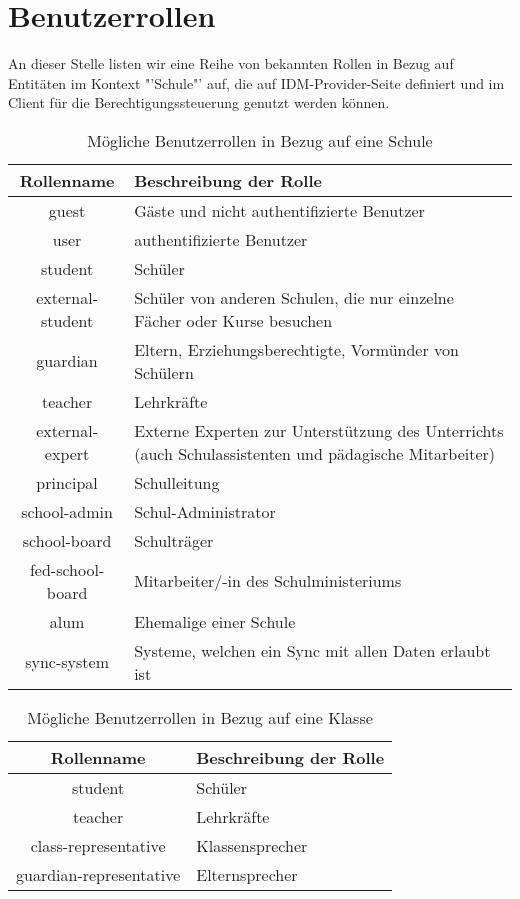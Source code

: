 \section{Benutzerrollen}
\label{Benutzerrollen}
An dieser Stelle listen wir eine Reihe von bekannten Rollen in Bezug auf Entitäten im Kontext "'Schule"' auf, die auf IDM-Provider-Seite definiert und im Client für die Berechtigungssteuerung genutzt werden können.
\\


\begin{table}[htb]
	\begin{tabularx}{\textwidth}{|c|X|}
		\hline
\textbf{Rollenname} & \textbf{Beschreibung der Rolle} \\ \hline
guest & Gäste und nicht authentifizierte Benutzer \\ \hline
user & authentifizierte Benutzer \\ \hline
student & Schüler \\ \hline
external-student & Schüler von anderen Schulen, die nur einzelne Fächer oder Kurse besuchen \\ \hline
guardian & Eltern, Erziehungsberechtigte, Vormünder von Schülern \\ \hline
teacher & Lehrkräfte \\ \hline
external-expert & Externe Experten zur Unterstützung des Unterrichts (auch Schulassistenten und pädagische Mitarbeiter) \\ \hline
principal & Schulleitung \\ \hline
school-admin & Schul-Administrator \\ \hline
school-board & Schulträger \\ \hline
fed-school-board & Mitarbeiter/-in des Schulministeriums \\ \hline
alum & Ehemalige einer Schule \\ \hline
sync-system & Systeme, welchen ein Sync mit allen Daten erlaubt ist \\ \hline

	\end{tabularx}

		\caption{Mögliche Benutzerrollen in Bezug auf eine Schule}
		\label{tab:intro:rolesschool}
\end{table}

\begin{table}[htb]
	\begin{tabularx}{\textwidth}{|c|X|}
		\hline
\textbf{Rollenname} & \textbf{Beschreibung der Rolle} \\ \hline
student & Schüler \\ \hline
teacher & Lehrkräfte \\ \hline
class-representative & Klassensprecher \\ \hline
guardian-representative & Elternsprecher \\ \hline

	\end{tabularx}

		\caption{Mögliche Benutzerrollen in Bezug auf eine Klasse}
		\label{tab:intro:rolesclass}
\end{table}

